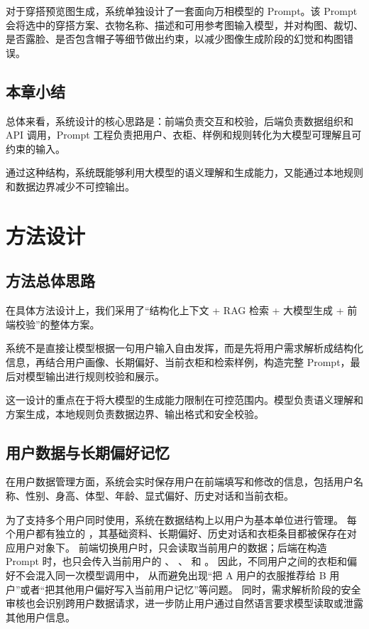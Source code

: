 \documentclass{applemlr}
\begin{document}
对于穿搭预览图生成，系统单独设计了一套面向万相模型的 Prompt。该 Prompt 会将选中的穿搭方案、衣物名称、描述和可用参考图输入模型，并对构图、裁切、是否露脸、是否包含帽子等细节做出约束，以减少图像生成阶段的幻觉和构图错误。

\subsection{本章小结}

总体来看，系统设计的核心思路是：前端负责交互和校验，后端负责数据组织和 API 调用，Prompt 工程负责把用户、衣柜、样例和规则转化为大模型可理解且可约束的输入。

通过这种结构，系统既能够利用大模型的语义理解和生成能力，又能通过本地规则和数据边界减少不可控输出。


\section{方法设计}
\label{sec:method}

\subsection{方法总体思路}

在具体方法设计上，我们采用了``结构化上下文 + RAG 检索 + 大模型生成 + 前端校验''的整体方案。

系统不是直接让模型根据一句用户输入自由发挥，而是先将用户需求解析成结构化信息，再结合用户画像、长期偏好、当前衣柜和检索样例，构造完整 Prompt，最后对模型输出进行规则校验和展示。

这一设计的重点在于将大模型的生成能力限制在可控范围内。模型负责语义理解和方案生成，本地规则负责数据边界、输出格式和安全校验。

\subsection{用户数据与长期偏好记忆}

在用户数据管理方面，系统会实时保存用户在前端填写和修改的信息，包括用户名称、性别、身高、体型、年龄、显式偏好、历史对话和当前衣柜。

为了支持多个用户同时使用，系统在数据结构上以用户为基本单位进行管理。
每个用户都有独立的 ，其基础资料、长期偏好、历史对话和衣柜条目都被保存在对应用户对象下。
前端切换用户时，只会读取当前用户的数据；后端在构造 Prompt 时，也只会传入当前用户的 、
、 和 。
因此，不同用户之间的衣柜和偏好不会混入同一次模型调用中，
从而避免出现“把 A 用户的衣服推荐给 B 用户”或者“把其他用户偏好写入当前用户记忆”等问题。
同时，需求解析阶段的安全审核也会识别跨用户数据请求，进一步防止用户通过自然语言要求模型读取或泄露其他用户信息。
\end{document}
